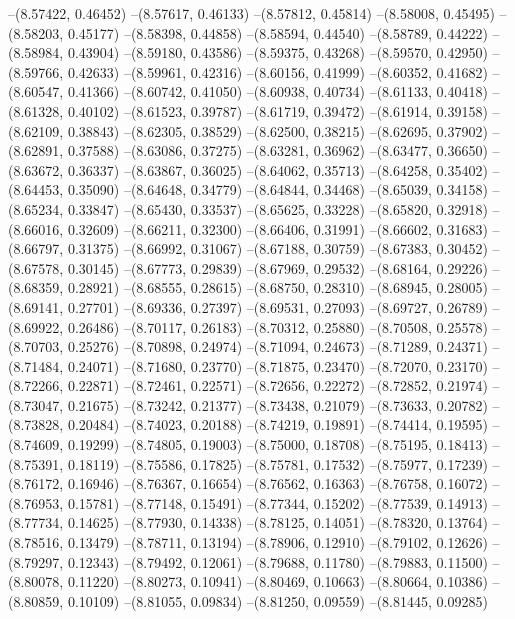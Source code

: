 --(8.57422, 0.46452)
--(8.57617, 0.46133)
--(8.57812, 0.45814)
--(8.58008, 0.45495)
--(8.58203, 0.45177)
--(8.58398, 0.44858)
--(8.58594, 0.44540)
--(8.58789, 0.44222)
--(8.58984, 0.43904)
--(8.59180, 0.43586)
--(8.59375, 0.43268)
--(8.59570, 0.42950)
--(8.59766, 0.42633)
--(8.59961, 0.42316)
--(8.60156, 0.41999)
--(8.60352, 0.41682)
--(8.60547, 0.41366)
--(8.60742, 0.41050)
--(8.60938, 0.40734)
--(8.61133, 0.40418)
--(8.61328, 0.40102)
--(8.61523, 0.39787)
--(8.61719, 0.39472)
--(8.61914, 0.39158)
--(8.62109, 0.38843)
--(8.62305, 0.38529)
--(8.62500, 0.38215)
--(8.62695, 0.37902)
--(8.62891, 0.37588)
--(8.63086, 0.37275)
--(8.63281, 0.36962)
--(8.63477, 0.36650)
--(8.63672, 0.36337)
--(8.63867, 0.36025)
--(8.64062, 0.35713)
--(8.64258, 0.35402)
--(8.64453, 0.35090)
--(8.64648, 0.34779)
--(8.64844, 0.34468)
--(8.65039, 0.34158)
--(8.65234, 0.33847)
--(8.65430, 0.33537)
--(8.65625, 0.33228)
--(8.65820, 0.32918)
--(8.66016, 0.32609)
--(8.66211, 0.32300)
--(8.66406, 0.31991)
--(8.66602, 0.31683)
--(8.66797, 0.31375)
--(8.66992, 0.31067)
--(8.67188, 0.30759)
--(8.67383, 0.30452)
--(8.67578, 0.30145)
--(8.67773, 0.29839)
--(8.67969, 0.29532)
--(8.68164, 0.29226)
--(8.68359, 0.28921)
--(8.68555, 0.28615)
--(8.68750, 0.28310)
--(8.68945, 0.28005)
--(8.69141, 0.27701)
--(8.69336, 0.27397)
--(8.69531, 0.27093)
--(8.69727, 0.26789)
--(8.69922, 0.26486)
--(8.70117, 0.26183)
--(8.70312, 0.25880)
--(8.70508, 0.25578)
--(8.70703, 0.25276)
--(8.70898, 0.24974)
--(8.71094, 0.24673)
--(8.71289, 0.24371)
--(8.71484, 0.24071)
--(8.71680, 0.23770)
--(8.71875, 0.23470)
--(8.72070, 0.23170)
--(8.72266, 0.22871)
--(8.72461, 0.22571)
--(8.72656, 0.22272)
--(8.72852, 0.21974)
--(8.73047, 0.21675)
--(8.73242, 0.21377)
--(8.73438, 0.21079)
--(8.73633, 0.20782)
--(8.73828, 0.20484)
--(8.74023, 0.20188)
--(8.74219, 0.19891)
--(8.74414, 0.19595)
--(8.74609, 0.19299)
--(8.74805, 0.19003)
--(8.75000, 0.18708)
--(8.75195, 0.18413)
--(8.75391, 0.18119)
--(8.75586, 0.17825)
--(8.75781, 0.17532)
--(8.75977, 0.17239)
--(8.76172, 0.16946)
--(8.76367, 0.16654)
--(8.76562, 0.16363)
--(8.76758, 0.16072)
--(8.76953, 0.15781)
--(8.77148, 0.15491)
--(8.77344, 0.15202)
--(8.77539, 0.14913)
--(8.77734, 0.14625)
--(8.77930, 0.14338)
--(8.78125, 0.14051)
--(8.78320, 0.13764)
--(8.78516, 0.13479)
--(8.78711, 0.13194)
--(8.78906, 0.12910)
--(8.79102, 0.12626)
--(8.79297, 0.12343)
--(8.79492, 0.12061)
--(8.79688, 0.11780)
--(8.79883, 0.11500)
--(8.80078, 0.11220)
--(8.80273, 0.10941)
--(8.80469, 0.10663)
--(8.80664, 0.10386)
--(8.80859, 0.10109)
--(8.81055, 0.09834)
--(8.81250, 0.09559)
--(8.81445, 0.09285)
